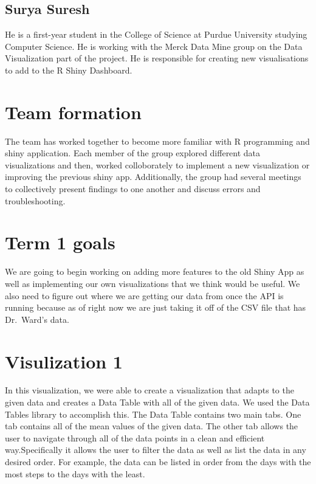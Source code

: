 \documentclass[]{book}
\begin{document}
\hypertarget{surya-suresh}{%
\subsection{Surya Suresh}\label{surya-suresh}}

He is a first-year student in the College of Science at Purdue University studying Computer Science. He is working with the Merck Data Mine group on the Data Visualization part of the project. He is responsible for creating new visualisations to add to the R Shiny Dashboard.

\hypertarget{team-formation}{%
\section{Team formation}\label{team-formation}}

The team has worked together to become more familiar with R programming and shiny application. Each member of the group explored different data visualizations and then, worked colloborately to implement a new visualization or improving the previous shiny app. Additionally, the group had several meetings to collectively present findings to one another and discuss errors and troubleshooting.

\hypertarget{term-1-goals}{%
\section{Term 1 goals}\label{term-1-goals}}

We are going to begin working on adding more features to the old Shiny App as well as implementing our own visualizations that we think would be useful. We also need to figure out where we are getting our data from once the API is running because as of right now we are just taking it off of the CSV file that has Dr.~Ward's data.

\hypertarget{visulization-1}{%
\section{Visulization 1}\label{visulization-1}}

In this visualization, we were able to create a visualization that adapts to the given data and creates a Data Table with all of the given data. We used the Data Tables library to
accomplish this. The Data Table contains two main tabs. One tab contains all of the mean values of the given data. The other tab allows the user to navigate through all of the data points in a clean and efficient way.Specifically it allows the user to filter the data as well as list the data in any desired order. For example, the data can be listed in order from the days
with the most steps to the days with the least.
\end{document}
